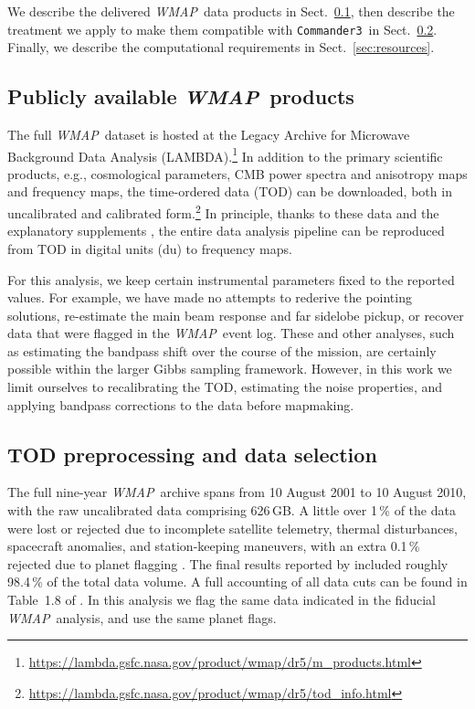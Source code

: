 \documentclass[twocolumn]{../../common/aa}
\def\WMAP{\emph{WMAP}}
\def\commanderthree{\texttt{Commander3}}
\begin{document}
We describe the delivered \WMAP\ data products in Sect.~\ref{sec:products}, then describe the treatment we apply to make them compatible with \commanderthree\ in Sect.~\ref{sec:preprocessing}. Finally, we describe the computational requirements in Sect.~\ref{sec:resources}.


\subsection{Publicly available \WMAP\ products}
\label{sec:products}

The full \WMAP\ dataset is hosted at the Legacy Archive for Microwave Background Data Analysis (LAMBDA).\footnote{\url{https://lambda.gsfc.nasa.gov/product/wmap/dr5/m_products.html}} In addition to the primary scientific products, e.g., cosmological parameters, CMB power spectra and anisotropy maps and frequency maps, the time-ordered data (TOD) can be downloaded, both in uncalibrated and calibrated form.\footnote{\url{https://lambda.gsfc.nasa.gov/product/wmap/dr5/tod_info.html}} In principle, thanks to these data and the explanatory supplements \citep{wmapexsupp}, the entire data analysis pipeline can be reproduced from TOD in digital units (du) to frequency maps.

For this analysis, we keep certain instrumental parameters fixed to the reported values. For example, we have made no attempts to rederive the pointing solutions, re-estimate the main beam response and far sidelobe pickup, or recover data that were flagged in the \WMAP\ event log. These and other analyses, such as estimating the bandpass shift over the course of the mission, are certainly possible within the larger Gibbs sampling framework. However, in this work we limit ourselves to recalibrating the TOD, estimating the noise properties, and applying bandpass corrections to the data before mapmaking.

\subsection{TOD preprocessing and data selection}
\label{sec:preprocessing}


The full nine-year \WMAP\ archive spans from 10 August 2001 to 10 August 2010, with the raw uncalibrated data comprising 626\,GB. A little over 1\,\% of the data were lost or rejected due to incomplete satellite telemetry, thermal disturbances, spacecraft anomalies, and station-keeping maneuvers, with an extra 0.1\,\% rejected due to planet flagging \citep{bennett2003a,hinshaw2007,hinshaw2009,bennett2012}. 
The final results reported by \citet{bennett2012} included roughly 98.4\,\% of the total data volume.
A full accounting of all data cuts can be found in Table~1.8 of \citet{wmapexsupp}. In this analysis we flag the same data indicated in the fiducial \WMAP\ analysis, and use the same planet flags.
\end{document}
